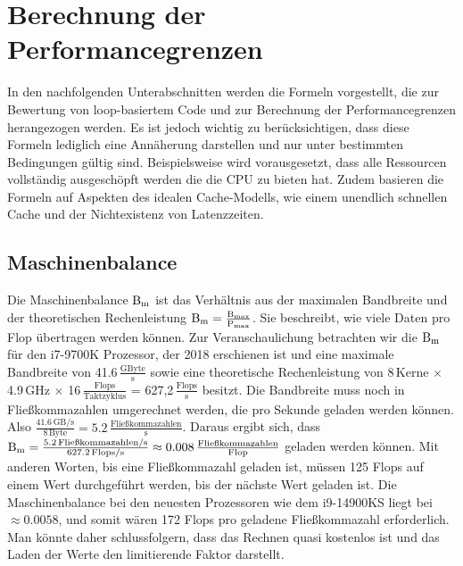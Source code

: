 \documentclass{article}
\begin{document}
    \section{Berechnung der Performancegrenzen}
    In den nachfolgenden Unterabschnitten werden die Formeln vorgestellt, 
    die zur Bewertung von loop-basiertem Code und zur Berechnung der Performancegrenzen herangezogen werden. 
    Es ist jedoch wichtig zu berücksichtigen, dass diese Formeln lediglich eine Annäherung darstellen 
    und nur unter bestimmten Bedingungen gültig sind. Beispielsweise wird vorausgesetzt, 
    dass alle Ressourcen vollständig ausgeschöpft werden die die CPU zu bieten hat. 
    Zudem basieren die Formeln auf Aspekten des idealen Cache-Modells, 
    wie einem unendlich schnellen Cache und der Nichtexistenz von Latenzzeiten.


    \subsection{Maschinenbalance}

    Die Maschinenbalance $\textnormal{B}_{\textnormal{m}}$ ist das Verhältnis 
    aus der maximalen Bandbreite und der theoretischen Rechenleistung
    $\textnormal{B}_{\textnormal{m}} = \frac{\textnormal{B}_{\textnormal{max}}}{\textnormal{P}_{\textnormal{max}}}$.
    Sie beschreibt, wie viele Daten pro Flop übertragen werden können. Zur Veranschaulichung 
    betrachten wir die $\textnormal{B}_{\textnormal{m}}$ für den i7-9700K Prozessor,     %
    der 2018 erschienen ist und eine maximale Bandbreite von 41.6\,$\frac{\text{GByte}}{\text{s}}$ sowie
    eine theoretische Rechenleistung von 8\,Kerne $\times$ 4.9\,GHz $\times$ 16\,$\frac{\text{Flops}}{\text{Taktzyklus}}$ = 627,2\,$\frac{\text{Flops}}{\text{s}}$ besitzt.
    Die Bandbreite muss noch in Fließkommazahlen umgerechnet werden, die pro Sekunde geladen werden können. Also
    $\frac{41.6 \, \text{GB/s}}{8 \, \text{Byte}} = 5.2 \, \frac{\text{Fließkommazahlen}}{\text{s}}$.
    Daraus ergibt sich, dass $\textnormal{B}_{\textnormal{m}} = \frac{5.2 \, \textnormal{Fließkommazahlen/s}}{627.2 \, \textnormal{Flops/s}} \approx 0.008\,\frac{\textnormal{Fließkommazahlen}}{\textnormal{Flop}}$
    geladen werden können. Mit anderen Worten, bis eine Fließkommazahl geladen ist, müssen
    125 Flops auf einem Wert durchgeführt werden, bis der nächste Wert geladen ist. 
    Die Maschinenbalance bei den neuesten Prozessoren wie dem i9-14900KS liegt bei $\approx 0.0058$, und somit wären 
    172 Flops pro geladene Fließkommazahl erforderlich. Man könnte daher schlussfolgern, 
    dass das Rechnen quasi kostenlos ist und das Laden der Werte den limitierende Faktor darstellt.
\end{document}
